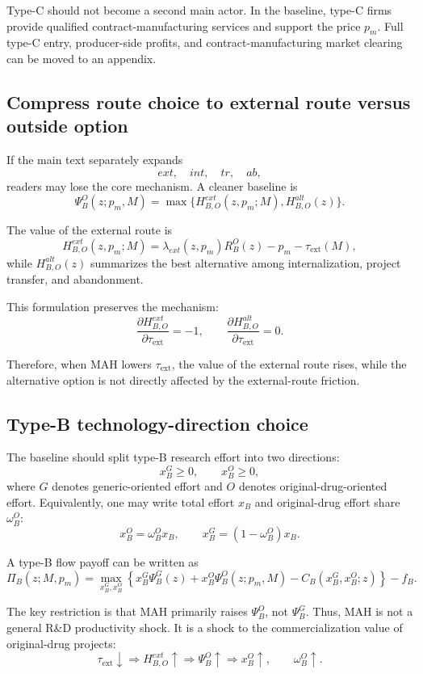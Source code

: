 \documentclass[12pt]{article}
\newcommand{\tauext}{\tau_{\mathrm{ext}}}
\begin{document}
Type-C should not become a second main actor. In the baseline, type-C firms provide qualified contract-manufacturing services and support the price $p_m$. Full type-C entry, producer-side profits, and contract-manufacturing market clearing can be moved to an appendix.

\subsection{Compress route choice to external route versus outside option}

If the main text separately expands
\[
ext,\quad int,\quad tr,\quad ab,
\]
readers may lose the core mechanism. A cleaner baseline is
\[
\Psi_B^O(z;p_m,M)=\max\{H_{B,O}^{ext}(z,p_m;M),H_{B,O}^{alt}(z)\}.
\]

The value of the external route is
\[
H_{B,O}^{ext}(z,p_m;M)=\lambda_{ext}(z,p_m)R_B^O(z)-p_m-\tauext(M),
\]
while $H_{B,O}^{alt}(z)$ summarizes the best alternative among internalization, project transfer, and abandonment.

This formulation preserves the mechanism:
\[
\frac{\partial H_{B,O}^{ext}}{\partial \tauext}=-1,
\qquad
\frac{\partial H_{B,O}^{alt}}{\partial \tauext}=0.
\]

Therefore, when MAH lowers $\tauext$, the value of the external route rises, while the alternative option is not directly affected by the external-route friction.

\subsection{Type-B technology-direction choice}

The baseline should split type-B research effort into two directions:
\[
x_B^G \ge 0,\qquad x_B^O \ge 0,
\]
where $G$ denotes generic-oriented effort and $O$ denotes original-drug-oriented effort. Equivalently, one may write total effort $x_B$ and original-drug effort share $\omega_B^O$:
\[
x_B^O=\omega_B^O x_B,\qquad x_B^G=(1-\omega_B^O)x_B.
\]

A type-B flow payoff can be written as
\[
\Pi_B(z;M,p_m)
=
\max_{x_B^G,x_B^O}\left\{
 x_B^G\Psi_B^G(z)
+x_B^O\Psi_B^O(z;p_m,M)
-C_B(x_B^G,x_B^O;z)
\right\}-f_B.
\]

The key restriction is that MAH primarily raises $\Psi_B^O$, not $\Psi_B^G$. Thus, MAH is not a general R\&D productivity shock. It is a shock to the commercialization value of original-drug projects:
\[
\tauext\downarrow
\Rightarrow H_{B,O}^{ext}\uparrow
\Rightarrow \Psi_B^O\uparrow
\Rightarrow x_B^O\uparrow,
\qquad
\omega_B^O\uparrow.
\]
\end{document}
